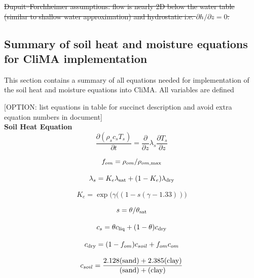 \documentclass{article}
\begin{document}
\st{Dupuit–Forchheimer assumptions: flow is nearly 2D below the water table (similar to shallow water approximation) and hydrostatic i.e. $\partial h/\partial z=0$.}

\subsection{Summary of soil heat and moisture equations for CliMA implementation}

This section contains a summary of all equations needed for implementation of the soil heat and moisture equations into CliMA. All variables are defined 

[OPTION: list equations in table for succinct description and avoid extra equation numbers in document] \\

\textbf{Soil Heat Equation} \\


\begin{equation}
     \frac{\partial (\rho_s c_s T_s) }{\partial t} = \frac{\partial }{\partial z}\lambda_s \frac{\partial T_s }{\partial z}
\end{equation}

\begin{equation}
    f_{om} = \rho_{om}/\rho_{om,{\rm max}}
\end{equation}


\begin{equation}
\lambda_s = K_e \lambda_{\rm sat} + (1-K_e) \lambda_{\rm dry}
\end{equation}

\begin{equation}
K_e = \exp \big( \gamma((1-s(\gamma-1.33))\big)
\end{equation}

\begin{equation}
s=\theta/\theta_{\rm sat}
\end{equation}

\begin{equation}
c_s=\theta c_{\rm liq} + (1-\theta) c_{\rm dry}
\end{equation}

\begin{equation}
c_{\rm dry} = (1-f_{om})c_{soil} + f_{om}c_{om}
\end{equation}

\begin{equation}
c_{soil} = {\rm \frac{2.128 (sand)+ 2.385 (clay)}{(sand) + (clay)}}
\end{equation}  \\
\end{document}
